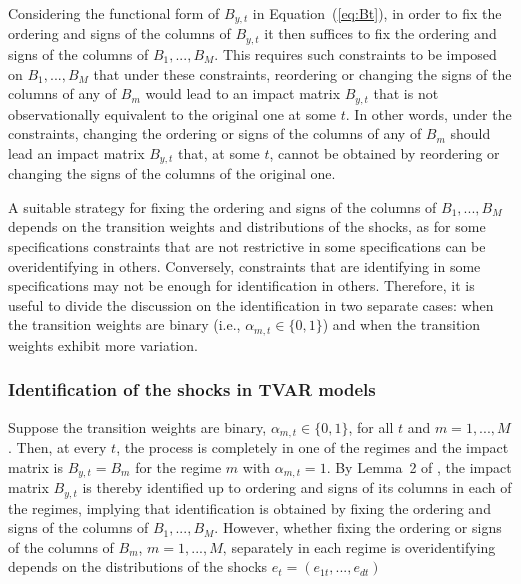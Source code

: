 \documentclass[nojss]{jss}
\begin{document}
Considering the functional form of $B_{y,t}$ in Equation~(\ref{eq:Bt}), in order to fix the ordering and signs of the columns of $B_{y,t}$ it then suffices to fix the ordering and signs of the columns of $B_1,...,B_M$. This requires such constraints to be imposed on $B_1,...,B_M$ that under these constraints, reordering or changing the signs of the columns of any of $B_m$ would lead to an impact matrix $B_{y,t}$ that is not observationally equivalent to the original one at some $t$. In other words, under the constraints, changing the ordering or signs of the columns of any of $B_m$ should lead an impact matrix $B_{y,t}$ that, at some $t$, cannot be obtained by reordering or changing the signs of the columns of the original one.

A suitable strategy for fixing the ordering and signs of the columns of $B_1,...,B_M$ depends on the transition weights and distributions of the shocks, as for some specifications constraints that are not restrictive in some specifications can be overidentifying in others. Conversely, constraints that are identifying in some specifications may not be enough for identification in others. Therefore, it is useful to divide the discussion on the identification in two separate cases: when the transition weights are binary (i.e., $\alpha_{m,t}\in\lbrace 0, 1\rbrace$) and when the transition weights exhibit more variation.

\subsubsection{Identification of the shocks in TVAR models}\label{sec:identtvar}

Suppose the transition weights are binary, $\alpha_{m,t}\in\lbrace 0, 1\rbrace$, for all $t$ and $m=1,...,M$. Then, at every $t$, the process is completely in one of the regimes and the impact matrix is $B_{y,t}=B_m$ for the regime $m$ with $\alpha_{m,t}=1$. By Lemma~2 of \cite{Virolainen2:2024}, the impact matrix $B_{y,t}$ is thereby identified up to ordering and signs of its columns in each of the regimes, implying that identification is obtained by fixing the ordering and signs of the columns of $B_1,...,B_M$. However, whether fixing the ordering or signs of the columns of $B_m$, $m=1,...,M$‚ separately in each regime is overidentifying depends on the distributions of the shocks $e_t=(e_{1t},...,e_{dt})$ \citep[see the discussion in]{Virolainen2:2024}
\end{document}

